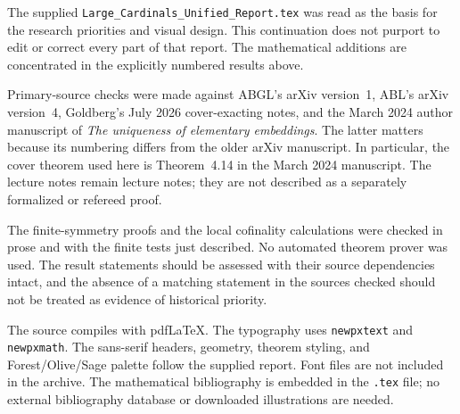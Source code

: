 \documentclass[11pt,letterpaper]{article}
\theoremstyle{definition}
\begin{document}
The supplied \nolinkurl{Large_Cardinals_Unified_Report.tex} was read as the basis for the research priorities and visual design. This continuation does not purport to edit or correct every part of that report. The mathematical additions are concentrated in the explicitly numbered results above.

Primary-source checks were made against ABGL's arXiv version~1, ABL's arXiv version~4, Goldberg's July 2026 cover-exacting notes, and the March 2024 author manuscript of \emph{The uniqueness of elementary embeddings}. The latter matters because its numbering differs from the older arXiv manuscript. In particular, the cover theorem used here is Theorem~4.14 in the March 2024 manuscript. The lecture notes remain lecture notes; they are not described as a separately formalized or refereed proof.

The finite-symmetry proofs and the local cofinality calculations were checked in prose and with the finite tests just described. No automated theorem prover was used. The result statements should be assessed with their source dependencies intact, and the absence of a matching statement in the sources checked should not be treated as evidence of historical priority.

The source compiles with pdfLaTeX. The typography uses \texttt{newpxtext} and \texttt{newpxmath}. The sans-serif headers, geometry, theorem styling, and Forest/Olive/Sage palette follow the supplied report. Font files are not included in the archive. The mathematical bibliography is embedded in the \texttt{.tex} file; no external bibliography database or downloaded illustrations are needed.
\end{document}
